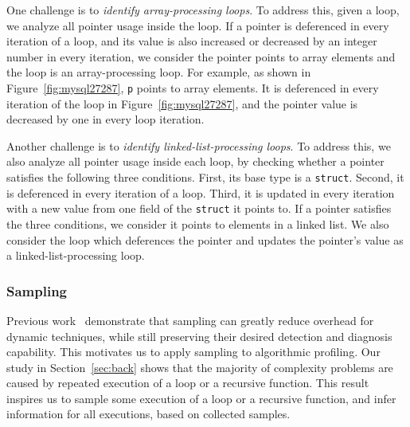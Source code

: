 One challenge is to \emph{identify array-processing loops}. 
%
To address this, given a loop, we analyze all pointer usage inside the loop. 
If a pointer is deferenced in every iteration of a loop, 
and its value is also increased or decreased by 
an integer number in every iteration,
we consider the pointer points to array elements and 
the loop is an array-processing loop.  
For example, as shown in Figure~\ref{fig:mysql27287}, 
\texttt{p} points to array elements. 
It is deferenced in every iteration of the loop 
in Figure~\ref{fig:mysql27287},
and the pointer value is decreased by one in every loop iteration. 

Another challenge is to \emph{identify linked-list-processing loops}.
To address this, we also analyze all pointer usage inside each loop, 
by checking whether a pointer satisfies the following three conditions.
First, its base type is a \texttt{struct}.
Second, it is deferenced in every iteration of a loop.
Third, it is updated in every iteration with a new value 
from one field of the \texttt{struct} it points to.
If a pointer satisfies the three conditions, 
we consider it points to elements in a linked list.
We also consider the loop which deferences the pointer and 
updates the pointer's value as  
a linked-list-processing loop. 



\subsubsection{Sampling}


Previous work~\cite{liblit03,liblit05,CCI,SongOOPSLA2014,ldoctor}
demonstrate that sampling can greatly 
reduce overhead for dynamic techniques,
while still preserving their desired 
detection and diagnosis capability. 
This motivates us to apply sampling to algorithmic profiling. 
Our study in Section~\ref{sec:back} shows that 
the majority of complexity problems are caused by repeated execution of a loop
or a recursive function. 
This result inspires us to sample some execution of 
a loop or a recursive function,
and infer information for all executions, 
based on collected samples.


